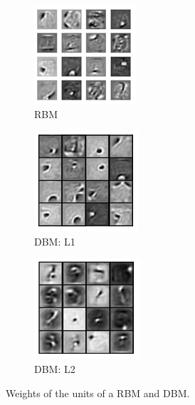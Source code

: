 \documentclass[a4paper,10pt]{article}
\begin{document}
\begin{figure}[ht]
	\begin{subfigure}{0.32\textwidth}
		\centering
		\includegraphics[width=0.5\linewidth]{DBM_RBM.png}
		\caption{RBM}
		\label{fig:DBM_RBM}
	\end{subfigure}	 	
	\begin{subfigure}{0.32\textwidth}
		\centering
		\includegraphics[width=0.5\linewidth]{DBM_L1.png}
		\caption{DBM: L1}
		\label{fig:DBM_L1}
	\end{subfigure}	
	\begin{subfigure}{0.32\textwidth}
		\centering
		\includegraphics[width=0.5\linewidth]{DBM_L2.png}
		\caption{DBM: L2}
		\label{fig:DBM_L2}
	\end{subfigure}
	\caption{Weights of the units of a RBM and DBM.}
	\label{fig:compareDBM}
\end{figure}
\end{document}
